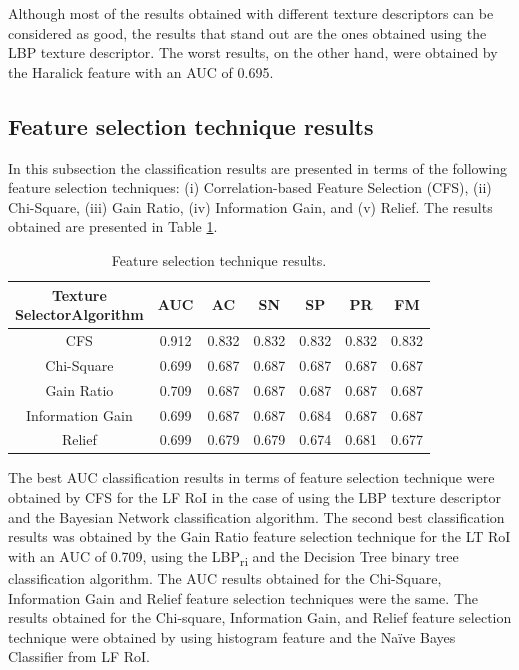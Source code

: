 \documentclass[review]{elsarticle}
\begin{document}
Although most of the results obtained with different texture descriptors can be considered as good, the results that stand out are the ones obtained using the LBP texture descriptor. The worst results, on the other hand, were obtained by the Haralick feature with an AUC of 0.695.

\subsection{Feature selection technique results}

In this subsection the classification results are presented in terms of the following feature selection techniques: (i) Correlation-based Feature Selection (CFS), (ii) Chi-Square, (iii) Gain Ratio, (iv) Information Gain, and (v) Relief. The results obtained are presented in Table \ref{tab:FeatureResult}.

\begin{table}[h!]
	\centering
	\begin{tabular}{|c|c|c|c|c|c|c|}
		\hline 
		\backslashbox{Texture \\ Selector}{Algorithm} &AUC&AC&SN&SP&PR&FM\\
		\hline 
	\cellcolor{blue!25}CFS			& \cellcolor{blue!25} 0.912 & \cellcolor{blue!25}0.832  & \cellcolor{blue!25}0.832 & \cellcolor{blue!25}0.832  & \cellcolor{blue!25}0.832  & \cellcolor{blue!25}0.832 \\ 
		\hline 
		Chi-Square	& 0.699 & 0.687 & 0.687 & 0.687  & 0.687  & 0.687  \\ 
		\hline 
		Gain Ratio		& 0.709  & 0.687  & 0.687  & 0.687  & 0.687  & 0.687  \\ 
		\hline 
		Information Gain 	& 0.699  & 0.687  & 0.687  & 0.684  & 0.687  & 0.687 \\ 
		\hline 
		Relief 		& 0.699  & 0.679  & 0.679  & 0.674 & 0.681  & 0.677  \\ 
		\hline
	\end{tabular} 
	\caption{Feature selection technique results.}
	\label{tab:FeatureResult}
\end{table}

The best AUC classification results in terms of feature selection technique were obtained by CFS for the LF RoI in the case of using the LBP texture descriptor and the Bayesian Network classification algorithm. The second best classification results was obtained by the Gain Ratio feature selection technique for the LT RoI with an AUC of 0.709, using the LBP\textsubscript{ri} and the Decision Tree binary tree classification algorithm. The AUC results obtained for the Chi-Square, Information Gain and Relief feature selection techniques were the same. The results obtained for the Chi-square, Information Gain, and Relief feature selection technique were obtained by using histogram feature and the Na\"ive Bayes Classifier from LF RoI. 
\end{document}
